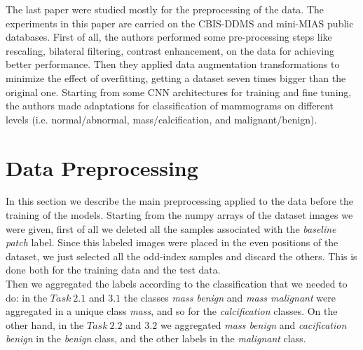 \documentclass[11pt,a4paper,oneside]{article}
\begin{document}
The last paper were studied mostly for the preprocessing of the data. The experiments in this paper are carried on the CBIS-DDMS and mini-MIAS public databases. First of all, the authors performed some pre-processing steps like rescaling, bilateral filtering, contrast enhancement, on the data for achieving better performance. Then they applied data augmentation transformations to minimize the effect of overfitting, getting a dataset seven times bigger than the original one. Starting from some CNN architectures for training and fine tuning, the authors made adaptations for classification of mammograms on different levels (i.e. normal/abnormal, mass/calcification, and malignant/benign). 


\clearpage

\section{Data Preprocessing}
In this section we describe the main preprocessing applied to the data before the training of the models. Starting from the numpy arrays of the dataset images we were given, first of all we deleted all the samples associated with the \textit{baseline patch} label. Since this labeled images were placed in the even positions of the dataset, we just selected all the odd-index samples and discard the others. This is done both for the training data and the test data. \\
Then we aggregated the labels according to the classification that we needed to do: in the $Task\ 2.1$ and $3.1$ the classes \textit{mass benign} and  \textit{mass malignant} were aggregated in a unique class \textit{mass}, and so for the \textit{calcification} classes. On the other hand, in the $Task\ 2.2$ and $3.2$ we aggregated  \textit{mass benign} and  \textit{cacification benign} in the \textit{benign} class, and the other labels in the \textit{malignant} class.
\end{document}
